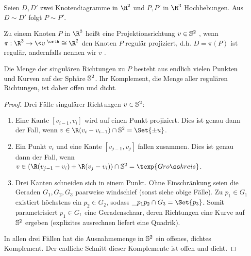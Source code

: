 \begin{lem}
    Seien $D, D'$ zwei Knotendiagramme in $\R^2$ und $P, P'$ in $\R^3$ Hochhebungen.
    Aus $D \sim D'$ folgt $P \sim P'$.
\end{lem}

\begin{df}
    Zu einem Knoten $P$ in $\R^3$ heißt eine Projektionsrichtung $v \in \S^2$ , wenn $\pi: \R^3 \to \<v\>^\orth \homeomorphic \R^2$ den Knoten $P$ regulär projiziert, d.h. $D = \pi(P)$ ist regulär, andernfalls nennen wir $v$ .
\end{df}

\begin{lem}
    Die Menge der singulären Richtungen zu $P$ besteht aus endlich vielen Punkten und Kurven auf der Sphäre $\S^2$.
    Ihr Komplement, die Menge aller regulären Richtungen, ist daher offen und dicht.
    \begin{proof}
        Drei Fälle singulärer Richtungen $v \in \S^2$:
        \begin{enumerate}[(1)]
            \item
                Eine Kante $[v_{i-1},v_i]$ wird auf einen Punkt projiziert.
                Dies ist genau dann der Fall, wenn $v \in \R(v_i - v_{i-1}) \cap \S^2 = \Set{\pm u}$.
            \item
                Ein Punkt $v_i$ und eine Kante $[v_{j-1}, v_j]$ fallen zusammen.
                Dies ist genau dann der Fall, wenn $v \in (\R(v_{j-1} - v_i) + \R(v_j - v_i)) \cap \S^2 = \texp{Großkreis}$.
            \item
                Drei Kanten schneiden sich in einem Punkt.
                Ohne Einschränkung seien die Geraden $G_1, G_2, G_3$ paarweise windschief (sonst siehe obige Fälle).
                Zu $p_1 \in G_1$ existiert höchstens ein $p_2 \in G_2$, sodass $\_{p_1 p_2} \cap G_3 = \Set{p_3}$.
                Somit parametrisiert $p_1 \in G_1$ eine Geradenschaar, deren Richtungen eine Kurve auf $\S^2$ ergeben (explizites ausrechnen liefert eine Quadrik).
        \end{enumerate}
        In allen drei Fällen hat die Ausnahmemenge in $\S^2$ ein offenes, dichtes Komplement.
        Der endliche Schnitt dieser Komplemente ist offen und dicht.
    \end{proof}
\end{lem}

